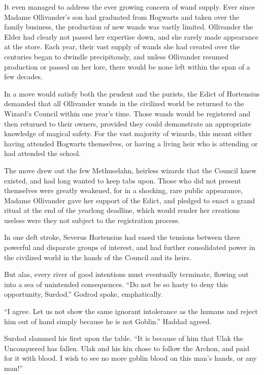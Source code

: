 It even managed to address the ever growing concern of wand supply. Ever since Madame Ollivander’s son had graduated from Hogwarts and taken over the family business, the production of new wands was vastly limited. Ollivander the Elder had clearly not passed her expertise down, and she rarely made appearance at the store. Each year, their vast supply of wands she had created over the centuries began to dwindle precipitously, and unless Ollivander resumed production or passed on her lore, there would be none left within the span of a few decades.

In a move would satisfy both the prudent and the purists, the Edict of Hortensius demanded that all Ollivander wands in the civilized world be returned to the Wizard’s Council within one year’s time. Those wands would be registered and then returned to their owners, provided they could demonstrate an appropriate knowledge of magical safety. For the vast majority of wizards, this meant either having attended Hogwarts themselves, or having a living heir who is attending or had attended the school.

The move drew out the few Methuselahn, heirless wizards that the Council knew existed, and had long wanted to keep tabs upon. Those who did not present themselves were greatly weakened, for in a shocking, rare public appearance, Madame Ollivander gave her support of the Edict, and pledged to enact a grand ritual at the end of the yearlong deadline, which would render her creations useless were they not subject to the registration process.

In one deft stroke, Severus Hortensius had eased the tensions between three powerful and disparate groups of interest, and had further consolidated power in the civilized world in the hands of the Council and its heirs.

But alas, every river of good intentions must eventually terminate, flowing out into a sea of unintended consequences.
\simpleline
{}
“Do not be so hasty to deny this opportunity, Surdod.” Godrod spoke, emphatically.

“I agree. Let us not show the same ignorant intolerance as the humans and reject him out of hand simply because he is not Goblin.” Haddad agreed.

Surdod slammed his first upon the table. “It is because of him that Ulak the Unconquered has fallen. Ulak and his kin chose to follow the Archon, and paid for it with blood. I wish to see no more goblin blood on this man’s hands, or any man!”

